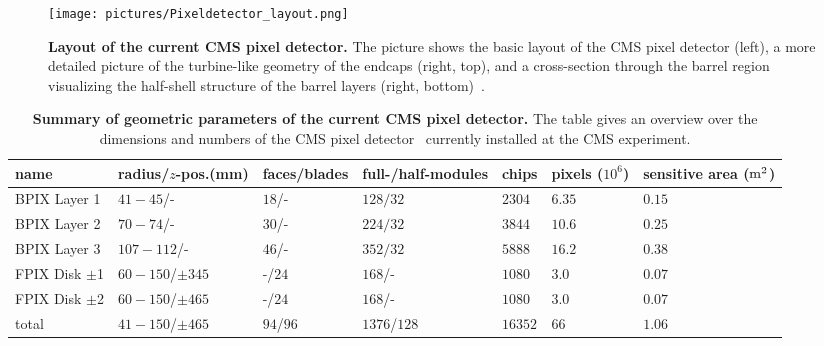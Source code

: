\begin{figure}
\begin{center}
\texttt{[image: pictures/Pixeldetector\_layout.png]}
\end{center}
\caption[Layout of the current CMS pixel detector]{\textbf{Layout of the current \acs{CMS} pixel detector.} The picture shows the basic layout of the \acs{CMS} pixel detector (left), a more detailed picture of the turbine-like geometry of the endcaps (right, top), and a cross-section through the barrel region visualizing the half-shell structure of the barrel layers (right, bottom)~\cite{C+08}.}\label{fig:pixel_detector_layout}
\end{figure}

\begin{table}
\caption[Summary of geometric parameters of the current CMS pixel detector]{\textbf{Summary of geometric parameters of the current \acs{CMS} pixel detector.} The table gives an overview over the dimensions and numbers of the \acs{CMS} pixel detector~\cite{C+08} currently installed at the \ac{CMS} experiment.}\label{tab:pixel_detector_old}
\begin{center}
\begin{tabular}{@{}p{24mm}p{24mm}p{12mm}p{16mm}p{8.5mm}p{8.5mm}p{22mm}}
\toprule
name&radius/$z$-pos.\newline (mm)&faces/\newline blades&full-/half-modules&chips&pixels ($10^6$)&sensitive area ($\rm{m^2}$)\\
\midrule
\acs{BPIX} Layer 1&$41-45$/-&$18$/-&$128/32$&$2304$&$6.35$&$0.15$\\
\acs{BPIX} Layer 2&$70-74$/-&$30$/-&$224/32$&$3844$&$10.6$&$0.25$\\
\acs{BPIX} Layer 3&$107-112$/-&$46$/-&$352/32$&$5888$&$16.2$&$0.38$\\
\acs{FPIX} Disk $\pm$1&$60-150$/$\pm 345$&-/$24$&$168$/-&$1080$&$3.0$&$0.07$\\
\acs{FPIX} Disk $\pm$2&$60-150$/$\pm 465$&-/$24$&$168$/-&$1080$&$3.0$&$0.07$\\
\midrule
total &$41-150$/$\pm 465$&$94$/$96$&$1376$/$128$&$16352$&$66$&$1.06$\\
\bottomrule
\end{tabular}
\end{center}
\end{table}

